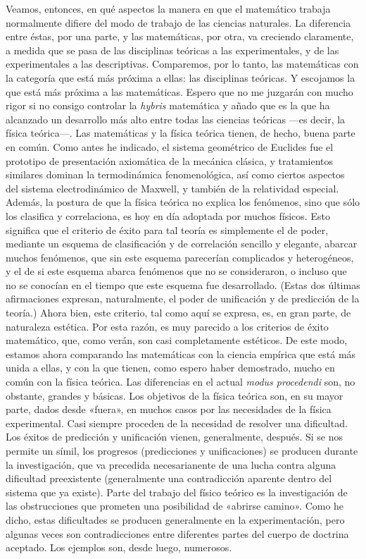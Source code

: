 \documentclass[a4paper, 12pt]{article}
\begin{document}
{Veamos, entonces, en qué aspectos la manera en que el matemático trabaja normalmente difiere del modo de trabajo de las ciencias naturales. La diferencia entre éstas, por una parte, y las matemáticas, por otra, va creciendo claramente, a medida que se pasa de las disciplinas teóricas a las experimentales, y de las experimentales a las descriptivas. Comparemos, por lo tanto, las matemáticas con la categoría que está más próxima a ellas: las disciplinas teóricas. Y escojamos la que está más próxima a las matemáticas. Espero que no me juzgarán con mucho rigor si no consigo controlar la \textit{hybris} matemática y añado que es la que ha alcanzado un desarrollo más alto entre todas las ciencias teóricas ---es decir, la física teórica---. Las matemáticas y la física teórica tienen, de hecho, buena parte en común. Como antes he indicado, el sistema geométrico de Euclides fue el prototipo de presentación axiomática de la mecánica clásica, y tratamientos similares dominan la termodinámica fenomenológica, así como ciertos aspectos del sistema electrodinámico de Maxwell, y también de la relatividad especial. Además, la postura de que la física teórica no explica los fenómenos, sino que sólo los clasifica y correlaciona, es hoy en día adoptada por muchos físicos. Esto significa que el criterio de éxito para tal teoría es simplemente el de poder, mediante un esquema de clasificación y de correlación sencillo y elegante, abarcar muchos fenómenos, que sin este esquema parecerían complicados y heterogéneos, y el de si este esquema abarca fenómenos que no se consideraron, o incluso que no se conocían en el tiempo
que este esquema fue desarrollado. (Estas dos últimas afirmaciones expresan, naturalmente, el poder de unificación y de predicción de la teoría.) Ahora bien, este criterio, tal como aquí se expresa, es, en gran parte, de naturaleza estética. Por esta razón, es muy parecido a los criterios de éxito matemático, que, como verán, son casi completamente estéticos. De este modo, estamos ahora comparando las matemáticas con la ciencia empírica que está más unida a ellas, y con la que tienen, como espero haber demostrado, mucho en común con la física teórica. Las diferencias en el actual \textit{modus procedendi} son, no obstante, grandes y básicas. Los objetivos de la física teórica son, en su mayor parte, dados desde «fuera», en muchos casos por las necesidades de la física experimental. Casi siempre proceden de la
	necesidad de resolver una dificultad. Los éxitos de predicción y unificación vienen, generalmente, después. Si se nos permite un símil, los progresos (predicciones y 	unificaciones) se producen durante la investigación, que va precedida necesarianente de una lucha contra alguna dificultad preexistente (generalmente una contradicción aparente dentro del sistema que ya existe). Parte del trabajo del físico teórico es la investigación de las obstrucciones que prometen una posibilidad de «abrirse camino». Como he dicho, estas dificultades se producen generalmente en la experimentación, pero algunas veces son contradicciones entre diferentes partes del cuerpo de doctrina aceptado. Los ejemplos son, desde luego, numerosos.
	
}
\end{document}
